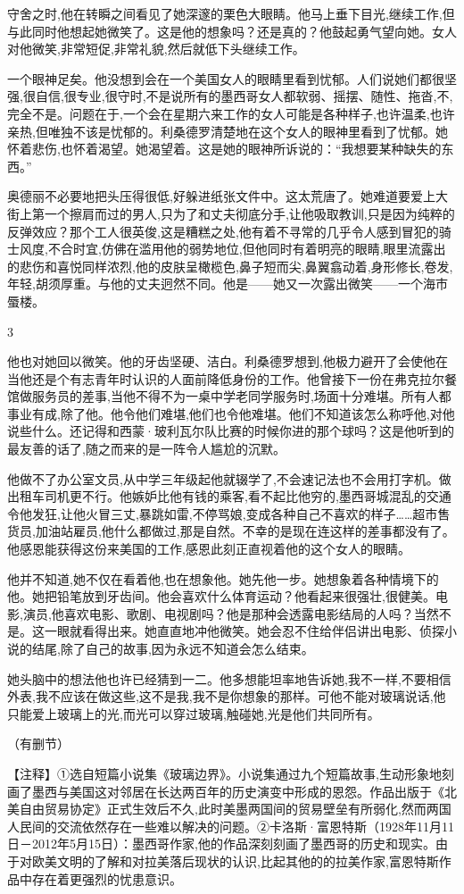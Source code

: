 \documentclass{ctexart}
\renewcommand{\\}{\par}
\begin{document}
守舍之时,他在转瞬之间看见了她深邃的栗色大眼睛。他马上垂下目光,继续工作,但与此同时他想起她微笑了。这是他的想象吗？还是真的？他鼓起勇气望向她。女人对他微笑,非常短促,非常礼貌,然后就低下头继续工作。\\一个眼神足矣。他没想到会在一个美国女人的眼睛里看到忧郁。人们说她们都很坚强,很自信,很专业,很守时,不是说所有的墨西哥女人都软弱、摇摆、随性、拖沓,不,完全不是。问题在于,一个会在星期六来工作的女人可能是各种样子,也许温柔,也许亲热,但唯独不该是忧郁的。利桑德罗清楚地在这个女人的眼神里看到了忧郁。她怀着悲伤,也怀着渴望。她渴望着。这是她的眼神所诉说的：“我想要某种缺失的东西。” \\奥德丽不必要地把头压得很低,好躲进纸张文件中。这太荒唐了。她难道要爱上大街上第一个擦肩而过的男人,只为了和丈夫彻底分手,让他吸取教训,只是因为纯粹的反弹效应？那个工人很英俊,这是糟糕之处,他有着不寻常的几乎令人感到冒犯的骑士风度,不合时宜,仿佛在滥用他的弱势地位,但他同时有着明亮的眼睛,眼里流露出的悲伤和喜悦同样浓烈,他的皮肤呈橄榄色,鼻子短而尖,鼻翼翕动着,身形修长,卷发,年轻,胡须厚重。与他的丈夫迥然不同。他是——她又一次露出微笑——一个海市蜃楼。 \\ \begin{center} 3 \end{center} \\他也对她回以微笑。他的牙齿坚硬、洁白。利桑德罗想到,他极力避开了会使他在当他还是个有志青年时认识的人面前降低身份的工作。他曾接下一份在弗克拉尔餐馆做服务员的差事,当他不得不为一桌中学老同学服务时,场面十分难堪。所有人都事业有成,除了他。他令他们难堪,他们也令他难堪。他们不知道该怎么称呼他,对他说些什么。还记得和西蒙·玻利瓦尔队比赛的时候你进的那个球吗？这是他听到的最友善的话了,随之而来的是一阵令人尴尬的沉默。 \\他做不了办公室文员,从中学三年级起他就辍学了,不会速记法也不会用打字机。做出租车司机更不行。他嫉妒比他有钱的乘客,看不起比他穷的,墨西哥城混乱的交通令他发狂,让他火冒三丈,暴跳如雷,不停骂娘,变成各种自己不喜欢的样子……超市售货员,加油站雇员,他什么都做过,那是自然。不幸的是现在连这样的差事都没有了。他感恩能获得这份来美国的工作,感恩此刻正直视着他的这个女人的眼睛。 \\他并不知道,她不仅在看着他,也在想象他。她先他一步。她想象着各种情境下的他。她把铅笔放到牙齿间。他会喜欢什么体育运动？他看起来很强壮,很健美。电影,演员,他喜欢电影、歌剧、电视剧吗？他是那种会透露电影结局的人吗？当然不是。这一眼就看得出来。她直直地冲他微笑。她会忍不住给伴侣讲出电影、侦探小说的结尾,除了自己的故事,因为永远不知道会怎么结束。\\她头脑中的想法他也许已经猜到一二。他多想能坦率地告诉她,我不一样,不要相信外表,我不应该在做这些,这不是我,我不是你想象的那样。可他不能对玻璃说话,他只能爱上玻璃上的光,而光可以穿过玻璃,触碰她,光是他们共同所有。 \\（有删节）\\【注释】①选自短篇小说集《玻璃边界》。小说集通过九个短篇故事,生动形象地刻画了墨西与美国这对邻居在长达两百年的历史演变中形成的恩怨。作品出版于《北美自由贸易协定》正式生效后不久,此时美墨两国间的贸易壁垒有所弱化,然而两国人民间的交流依然存在一些难以解决的问题。②卡洛斯·富恩特斯（1928年11月11日－2012年5月15日）：墨西哥作家,他的作品深刻刻画了墨西哥的历史和现实。由于对欧美文明的了解和对拉美落后现状的认识,比起其他的的拉美作家,富恩特斯作品中存在着更强烈的忧患意识。
\end{document}
